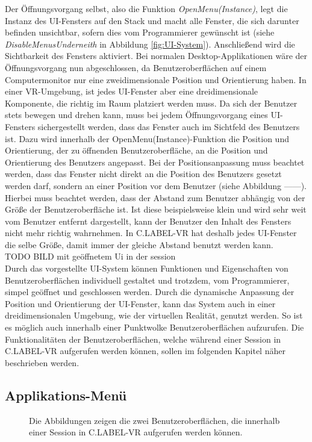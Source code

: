 Der Öffnungsvorgang selbst, also die Funktion \textit{OpenMenu(Instance)}, legt die Instanz des UI-Fensters auf den Stack und macht alle Fenster, die sich darunter befinden unsichtbar, sofern dies vom Programmierer gewünscht ist (siehe \textit{DisableMenusUnderneith} in Abbildung \ref{fig:UI-System}). Anschließend wird die Sichtbarkeit des Fensters aktiviert. Bei normalen Desktop-Applikationen wäre der Öffnungsvorgang nun abgeschlossen, da Benutzeroberflächen auf einem Computermonitor nur eine zweidimensionale Position und Orientierung haben. In einer VR-Umgebung, ist jedes UI-Fenster aber eine dreidimensionale Komponente, die richtig im Raum platziert werden muss. Da sich der Benutzer stets bewegen und drehen kann, muss bei jedem Öffnungsvorgang eines UI-Fensters sichergestellt werden, dass das Fenster auch im Sichtfeld des Benutzers ist. Dazu wird innerhalb der OpenMenu(Instance)-Funktion die Position und Orientierung, der zu öffnenden Benutzeroberfläche, an die Position und Orientierung des Benutzers angepasst. Bei der Positionsanpassung muss beachtet werden, dass das Fenster nicht direkt an die Position des Benutzers gesetzt werden darf, sondern an einer Position vor dem Benutzer (siehe Abbildung ------). Hierbei muss beachtet werden, dass der Abstand zum Benutzer abhängig von der Größe der Benutzeroberfläche ist. Ist diese beispielsweise klein und wird sehr weit vom Benutzer entfernt dargestellt, kann der Benutzer den Inhalt des Fensters nicht mehr richtig wahrnehmen. In C.LABEL-VR hat deshalb jedes UI-Fenster die selbe Größe, damit immer der gleiche Abstand benutzt werden kann.\\

TODO BILD mit geöffnetem Ui in der session\\

Durch das vorgestellte UI-System können Funktionen und Eigenschaften von Benutzeroberflächen individuell gestaltet und trotzdem, vom Programmierer, simpel geöffnet und geschlossen werden. Durch die dynamische Anpassung der Position und Orientierung der UI-Fenster, kann das System auch in einer dreidimensionalen Umgebung, wie der virtuellen Realität, genutzt werden. So ist es möglich auch innerhalb einer Punktwolke Benutzeroberflächen aufzurufen. Die Funktionalitäten der Benutzeroberflächen, welche während einer Session in C.LABEL-VR aufgerufen werden können, sollen im folgenden Kapitel näher beschrieben werden.
  
\subsection{Applikations-Menü}
\label{sec:AppMenu}
\begin{figure}
    \centering
    \qquad
    \caption{Die Abbildungen zeigen die zwei Benutzeroberflächen, die innerhalb einer Session in C.LABEL-VR aufgerufen werden können.}\label{fig:ApplicationMenu}%
\end{figure}


